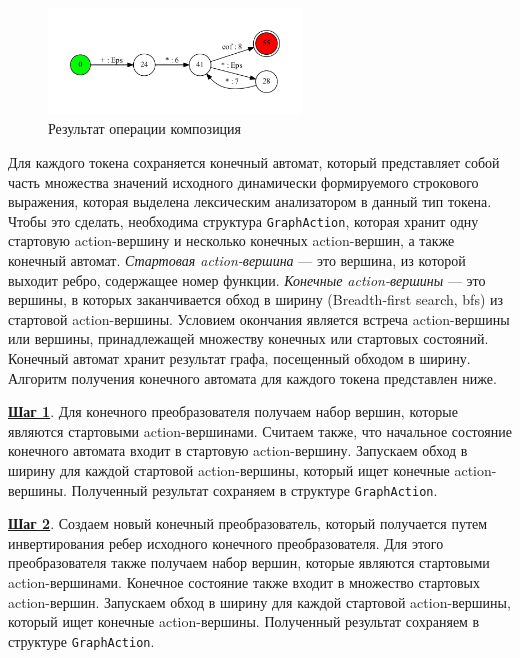 \documentclass{matmex-diploma}
\begin{document}
\begin{figure}[h!]
\begin{center}
\includegraphics[width=0.6\textwidth]{calc_ex_compose}
\caption{Результат операции композиция}
\label{fig:calc_ex_compose} 
\end{center}
\end{figure}
Для каждого токена сохраняется конечный автомат, который представляет собой часть множества значений исходного динамически формируемого строкового выражения, которая выделена лексическим анализатором в данный тип токена. Чтобы это сделать, необходима структура \verb|GraphAction|, которая хранит одну стартовую action-вершину и несколько конечных action-вершин, а также конечный автомат. \textit{Стартовая action-вершина} --- это вершина, из которой выходит ребро, содержащее номер функции. \textit{Конечные action-вершины} --- это вершины, в которых заканчивается обход в ширину (Breadth-first search, bfs) из стартовой action-вершины. Условием окончания является встреча action-вершины или вершины, принадлежащей множеству конечных или стартовых состояний. Конечный автомат хранит результат графа, посещенный обходом в ширину. Алгоритм получения конечного автомата для каждого токена представлен ниже.

\textbf{\underline{Шаг 1}}. Для конечного преобразователя получаем набор вершин, которые являются стартовыми action-вершинами. Считаем также, что начальное состояние конечного автомата входит в стартовую action-вершину. Запускаем обход в ширину для каждой стартовой action-вершины, который ищет конечные action-вершины. Полученный результат сохраняем в структуре \verb|GraphAction|.  

\textbf{\underline{Шаг 2}}. Создаем новый конечный преобразователь, который получается путем инвертирования ребер исходного конечного преобразователя. Для этого преобразователя также получаем набор вершин, которые являются стартовыми action-вершинами. Конечное состояние также входит в множество стартовых action-вершин. Запускаем обход в ширину для каждой стартовой action-вершины, который ищет конечные action-вершины. Полученный результат сохраняем в структуре \verb|GraphAction|. 
\end{document}
